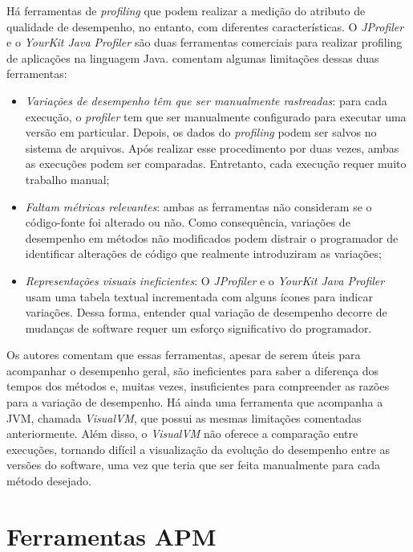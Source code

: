 Há ferramentas de \textit{profiling} que podem realizar a medição do atributo de qualidade de desempenho, no entanto, com diferentes características. O \textit{JProfiler} \cite{JProfiler} e o \textit{YourKit Java Profiler} \cite{Profiler2016} são duas ferramentas comerciais para realizar profiling de aplicações na linguagem Java. \citeauthor{SandovalAlcocer2013} comentam algumas limitações dessas duas ferramentas:
\begin{itemize}
	\item \textit{Variações de desempenho têm que ser manualmente rastreadas}: para cada execução, o \textit{profiler} tem que ser manualmente configurado para executar uma versão em particular. Depois, os dados do \textit{profiling} podem ser salvos no sistema de arquivos. Após realizar esse procedimento por duas vezes, ambas as execuções podem ser comparadas. Entretanto, cada execução requer muito trabalho manual;
	\item \textit{Faltam métricas relevantes}: ambas as ferramentas não consideram se o código-fonte foi alterado ou não. Como consequência, variações de desempenho em métodos não modificados podem distrair o programador de identificar alterações de código que realmente introduziram as variações;
	\item \textit{Representações visuais ineficientes}: O \textit{JProfiler} e o \textit{YourKit Java Profiler} usam uma tabela textual incrementada com alguns ícones para indicar variações. Dessa forma, entender qual variação de desempenho decorre de mudanças de software requer um esforço significativo do programador.
\end{itemize}

Os autores comentam que essas ferramentas, apesar de serem úteis para acompanhar o desempenho geral, são ineficientes para saber a diferença dos tempos dos métodos e, muitas vezes, insuficientes para compreender as razões para a variação de desempenho. Há ainda uma ferramenta que acompanha a JVM, chamada \textit{VisualVM}, que possui as mesmas limitações comentadas anteriormente. Além disso, o \textit{VisualVM} não oferece a comparação entre execuções, tornando difícil a visualização da evolução do desempenho entre as versões do software, uma vez que teria que ser feita manualmente para cada método desejado.

\section{Ferramentas APM} \label{sec:trabalhos-relacionados-ferramentas-apm}

